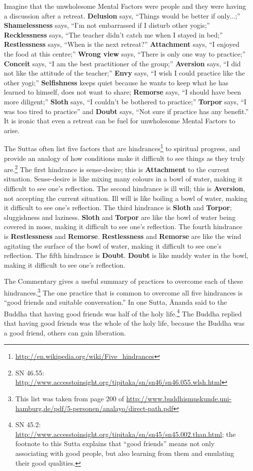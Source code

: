 Imagine that the unwholesome Mental Factors were people and they were having a discussion after a retreat. \textbf{Delusion} says, “Things would be better if only...;” \textbf{Shamelessness} says, “I’m not embarrassed if I disturb other yogis;” \textbf{Recklessness} says, “The teacher didn’t catch me when I stayed in bed;” \textbf{Restlessness} says, “When is the next retreat?” \textbf{Attachment} says, “I enjoyed the food at this centre;” \textbf{Wrong view} says, “There is only one way to practice;” \textbf{Conceit} says, “I am the best practitioner of the group;” \textbf{Aversion} says, “I did not like the attitude of the teacher;” \textbf{Envy} says, “I wish I could practice like the other yogi;” \textbf{Selfishness} keeps quiet because he wants to keep what he has learned to himself, does not want to share; \textbf{Remorse} says, “I should have been more diligent;” \textbf{Sloth} says, “I couldn’t be bothered to practice;” \textbf{Torpor} says, “I was too tired to practice” and \textbf{Doubt} says, “Not sure if practice has any benefit.” It is ironic that even a retreat can be fuel for unwholesome Mental Factors to arise.

The Suttas often list five factors that are hindrances\footnote{\url{http://en.wikipedia.org/wiki/Five_hindrances}} to spiritual progress, and provide an analogy of how conditions make it difficult to see things as they truly are.\footnote{SN 46.55: \url{http://www.accesstoinsight.org/tipitaka/sn/sn46/sn46.055.wlsh.html}} The first hindrance is sense-desire; this is \textbf{Attachment} to the current situation. Sense-desire is like mixing many colours in a bowl of water, making it difficult to see one’s reflection. The second hindrance is ill will; this is \textbf{Aversion}, not accepting the current situation. Ill will is like boiling a bowl of water, making it difficult to see one’s reflection. The third hindrance is \textbf{Sloth} and \textbf{Torpor}; sluggishness and laziness. \textbf{Sloth} and \textbf{Torpor} are like the bowl of water being covered in moss, making it difficult to see one’s reflection. The fourth hindrance is \textbf{Restlessness} and \textbf{Remorse}. \textbf{Restlessness} and \textbf{Remorse} are like the wind agitating the surface of the bowl of water, making it difficult to see one’s reflection. The fifth hindrance is \textbf{Doubt}. \textbf{Doubt} is like muddy water in the bowl, making it difficult to see one’s reflection.

The Commentary gives a useful summary of practices to overcome each of these hindrances.\footnote{This list was taken from page 200 of \url{http://www.buddhismuskunde.uni-hamburg.de/pdf/5-personen/analayo/direct-path.pdf}} The one practice that is common to overcome all five hindrances is “good friends and suitable conversation.” In one Sutta, Ānanda said to the Buddha that having good friends was half of the holy life.\footnote{SN 45.2: \url{http://www.accesstoinsight.org/tipitaka/sn/sn45/sn45.002.than.html}; the footnote to this Sutta explains that “good friends” means not only associating with good people, but also learning from them and emulating their good qualities.} The Buddha replied that having good friends was the whole of the holy life, because the Buddha was a good friend, others can gain liberation.

